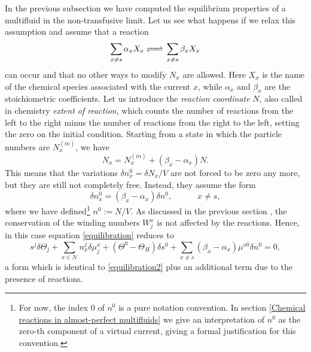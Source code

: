 \documentclass[usenatbib]{mnras}
\newcommand{\spc}{\quad \quad \quad}
\begin{document}
In the previous subsection we have computed the equilibrium properties of a multifluid in the non-transfusive limit. Let us see what happens if we relax this assumption and assume that a reaction 
%
\begin{equation}\label{lareazioncionagenerica}
\sum_{x \neq s} \alpha_x X_x \ce{ <=> } \sum_{x \neq s} \beta_x X_x
\end{equation}
%
can occur and that no other ways to modify $N_x$ are allowed. Here $X_x$ is the name of the chemical species associated with the current $x$, while $\alpha_x$ and $\beta_x$ are the stoichiometric coefficients. Let us introduce the \emph{reaction coordinate} $N$, also called in chemistry \emph{extent of reaction}, which counts the number of reactions from the left to the right minus the number of reactions from the right to the left, setting the zero on the initial condition. Starting from a state in which the particle numbers are $N_x^{(in)}$, we have
%
\begin{equation}
\label{conservotutto}
N_x = N_x^{(in)} + (\beta_x - \alpha_x)N.
\end{equation}
%
This means that the variations $\delta n_x^0=\delta N_x/V$ are not forced to be zero any more, but they are still not completely free. Instead, they assume the form
%
\begin{equation}
\label{mnnbufti}
\delta n_x^0 = (\beta_x - \alpha_x)\delta n^0, \spc x\neq s,
\end{equation}
%
where we have defined\footnote{
For now, the index $0$ of $n^0$ is a pure notation convention. In section \ref{Chemical reactions in almost-perfect multifluids} we give an interpretation of $n^0$ as the zero-th component of a virtual current, giving a formal justification for this convention.
} 
$n^0:= N/V$.
As discussed in the previous section , the conservation of the winding numbers $W^x_j$ is not affected by the reactions. Hence, in this case equation \eqref{equilibration} reduces to
%
\begin{equation}\label{eqeqeqeqeqchimicissimo}
 s^j \delta \Theta_j + \sum_{x \in \mathcal{N}}  n_x^j \delta \mu_{j}^x +(\Theta^0 -\Theta_H)\delta s^0  
+
\sum_{x \neq s} (\beta_x - \alpha_x)\mu^{x0} \delta n^0 =0 ,
\end{equation}
%
a form which is identical to \eqref{equilibration2} plus an additional term due to the presence of reactions.
\end{document}
